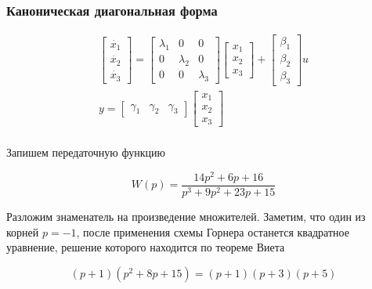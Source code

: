 \documentclass[a5paper, 10pt]{article}
\theoremstyle{definition}
\theoremstyle{plain}
\theoremstyle{remark}
\begin{document}
\subsubsection{Каноническая диагональная форма}
\begin{multline}
\begin{bmatrix}
\dot{x_1}\\
\dot{x_2}\\
\dot{x_3}
\end{bmatrix}
=
\begin{bmatrix}
\lambda_1 & 0 & 0\\
0 & \lambda_2 & 0\\
0 & 0 & \lambda_3
\end{bmatrix}
\begin{bmatrix}
x_1\\
x_2\\
x_3
\end{bmatrix}
+
\begin{bmatrix}
\beta_1\\
\beta_2\\
\beta_3
\end{bmatrix}
u\\
y = 
\begin{bmatrix}
\gamma_1 & \gamma_2 & \gamma_3
\end{bmatrix}
\begin{bmatrix}
x_1\\
x_2\\
x_3
\end{bmatrix}\\
\end{multline}

Запишем передаточную функцию

\begin{equation}
W(p) = \frac{14 p^2 + 6 p + 16}{p^3 + 9 p^2 + 23 p + 15} 
\end{equation}

    Разложим знаменатель на произведение множителей. Заметим, что один из корней $p=-1$, после применения схемы Горнера останется квадратное уравнение, решение которого находится по теореме Виета

\begin{equation}
\left(p+1 \right) \left( p^2 + 8p + 15 \right) =  \left(p+1 \right) \left(p+3 \right) \left(p+5 \right)
\end{equation}
\end{document}
